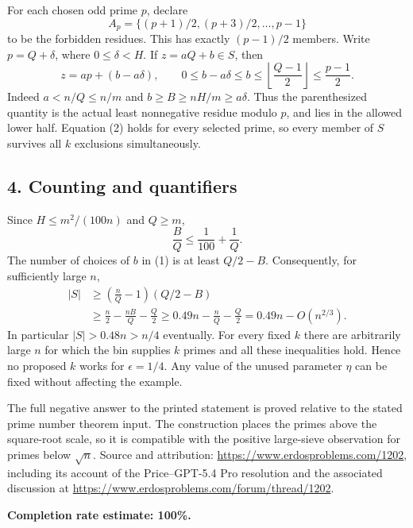 For each chosen odd prime $p$, declare
\[
 A_p=\{(p+1)/2,(p+3)/2,\ldots,p-1\}
\]
to be the forbidden residues. This has exactly $(p-1)/2$ members. Write $p=Q+\delta$, where $0\le\delta<H$. If $z=aQ+b\in S$, then
\[
 z=ap+(b-a\delta),\qquad
 0\le b-a\delta\le b\le\left\lfloor\frac{Q-1}{2}\right\rfloor
 \le\frac{p-1}{2}. \tag{2}
\]
Indeed $a<n/Q\le n/m$ and $b\ge B\ge nH/m\ge a\delta$. Thus the parenthesized quantity is the actual least nonnegative residue modulo $p$, and lies in the allowed lower half. Equation (2) holds for every selected prime, so every member of $S$ survives all $k$ exclusions simultaneously.

\subsection*{4. Counting and quantifiers}
Since $H\le m^2/(100n)$ and $Q\ge m$,
\[
 \frac BQ\le\frac1{100}+\frac1Q.
\]
The number of choices of $b$ in (1) is at least $Q/2-B$. Consequently, for sufficiently large $n$,
\[
 \begin{split}
 |S|&\ge\left(\frac nQ-1\right)(Q/2-B)\\
 &\ge \frac n2-\frac{nB}{Q}-\frac Q2
 \ge0.49n-\frac nQ-\frac Q2
 =0.49n-O(n^{2/3}).
 \end{split}
\]
In particular $|S|>0.48n>n/4$ eventually. For every fixed $k$ there are arbitrarily large $n$ for which the bin supplies $k$ primes and all these inequalities hold. Hence no proposed $k$ works for $\epsilon=1/4$. Any value of the unused parameter $\eta$ can be fixed without affecting the example.

The full negative answer to the printed statement is proved relative to the stated prime number theorem input. The construction places the primes above the square-root scale, so it is compatible with the positive large-sieve observation for primes below $\sqrt n$.
Source and attribution: \url{https://www.erdosproblems.com/1202}, including its account of the Price--GPT-5.4 Pro resolution and the associated discussion at \url{https://www.erdosproblems.com/forum/thread/1202}.

\textbf{Completion rate estimate: 100\%.}
